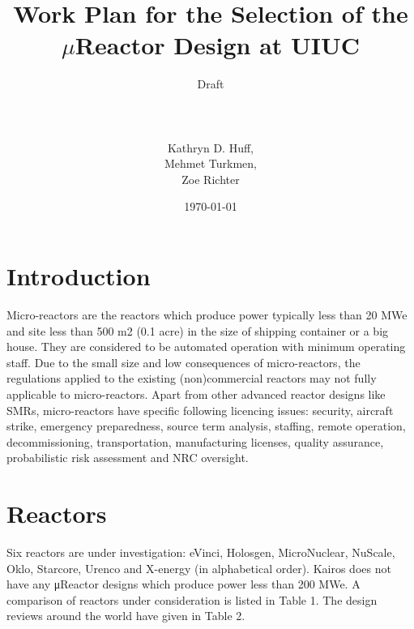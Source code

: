 \documentclass[10pt,a4paper]{article}
\begin{document}
\title{Work Plan for the Selection of the $\mu$Reactor Design at UIUC\\}
\author{Draft\\ \\ \\ \\ Kathryn D. Huff,\\
Mehmet Turkmen,\\
Zoe Richter}
\date{\today}
\maketitle

\pagebreak
\section{Introduction}
Micro-reactors are the reactors which produce power typically less than 20 MWe and site less than 500 m2 (0.1 acre) in the size of shipping container or a big house. They are considered to be automated operation with minimum operating staff. Due to the small size and low consequences of micro-reactors, the regulations applied to the existing (non)commercial reactors may not fully applicable to micro-reactors. Apart from other advanced reactor designs like SMRs, micro-reactors have specific following licencing issues: security, aircraft strike, emergency preparedness, source term analysis, staffing, remote operation, decommissioning, transportation, manufacturing licenses, quality assurance, probabilistic risk assessment and NRC oversight.

\section{Reactors}
Six reactors are under investigation: eVinci, Holosgen, MicroNuclear, NuScale, Oklo, Starcore, Urenco and X-energy (in alphabetical order). Kairos does not have any μReactor designs which produce power less than 200 MWe. A comparison of reactors under consideration is listed in Table 1. The design reviews around the world have given in Table 2. 
\end{document}
